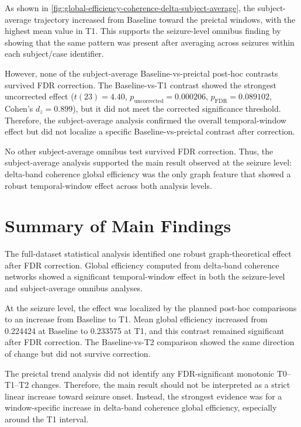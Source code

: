 As shown in \cref{fig:global-efficiency-coherence-delta-subject-average}, the
subject-average trajectory increased from Baseline toward the preictal windows,
with the highest mean value in T1. This supports the seizure-level omnibus
finding by showing that the same pattern was present after averaging across
seizures within each subject/case identifier.

However, none of the subject-average Baseline-vs-preictal post-hoc contrasts
survived FDR correction. The Baseline-vs-T1 contrast showed the strongest
uncorrected effect
($t(23) = 4.40$, $p_{\mathrm{uncorrected}} = 0.000206$,
$p_{\mathrm{FDR}} = 0.089102$, Cohen's $d_z = 0.899$), but it did not meet the
corrected significance threshold. Therefore, the subject-average analysis
confirmed the overall temporal-window effect but did not localize a specific
Baseline-vs-preictal contrast after correction.

No other subject-average omnibus test survived FDR correction. Thus, the
subject-average analysis supported the main result observed at the seizure
level: delta-band coherence global efficiency was the only graph feature that
showed a robust temporal-window effect across both analysis levels.

\section{Summary of Main Findings}
\label{sec:results-summary-main-findings}

The full-dataset statistical analysis identified one robust graph-theoretical
effect after FDR correction. Global efficiency computed from delta-band
coherence networks showed a significant temporal-window effect in both the
seizure-level and subject-average omnibus analyses.

At the seizure level, the effect was localized by the planned post-hoc
comparisons to an increase from Baseline to T1. Mean global efficiency increased
from \num{0.224424} at Baseline to \num{0.233575} at T1, and this contrast
remained significant after FDR correction. The Baseline-vs-T2 comparison showed
the same direction of change but did not survive correction.

The preictal trend analysis did not identify any FDR-significant monotonic
T0--T1--T2 changes. Therefore, the main result should not be interpreted as a
strict linear increase toward seizure onset. Instead, the strongest evidence was
for a window-specific increase in delta-band coherence global efficiency,
especially around the T1 interval.

